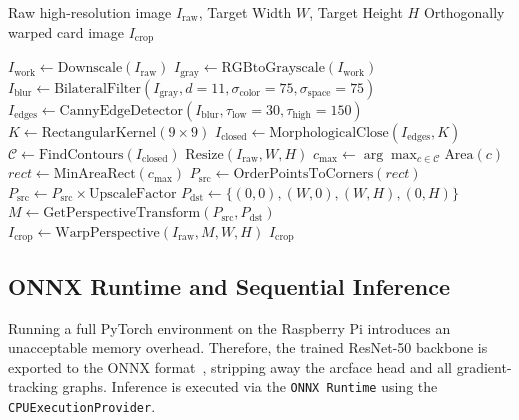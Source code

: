\begin{algorithm}[htbp]
    \caption{Card Localization and Homography Extraction}
    \label{alg:crop_card}
    \begin{algorithmic}[1]
    \Require Raw high-resolution image $I_{\text{raw}}$, Target Width $W$, Target Height $H$
    \Ensure Orthogonally warped card image $I_{\text{crop}}$

    \State $I_{\text{work}} \gets \text{Downscale}(I_{\text{raw}})$ 
    \State $I_{\text{gray}} \gets \text{RGBtoGrayscale}(I_{\text{work}})$
    \State $I_{\text{blur}} \gets \text{BilateralFilter}(I_{\text{gray}}, d=11, \sigma_{\text{color}}=75, \sigma_{\text{space}}=75)$
    \State $I_{\text{edges}} \gets \text{CannyEdgeDetector}(I_{\text{blur}}, \tau_{\text{low}}=30, \tau_{\text{high}}=150)$
    \State $K \gets \text{RectangularKernel}(9 \times 9)$
    \State $I_{\text{closed}} \gets \text{MorphologicalClose}(I_{\text{edges}}, K)$ 
    \State $\mathcal{C} \gets \text{FindContours}(I_{\text{closed}})$
        \State \Return $\text{Resize}(I_{\text{raw}}, W, H)$ 
    \EndIf
    \State $c_{\text{max}} \gets \arg\max_{c \in \mathcal{C}} \text{Area}(c)$
    \State $rect \gets \text{MinAreaRect}(c_{\text{max}})$ 
    \State $P_{\text{src}} \gets \text{OrderPointsToCorners}(rect)$ 
    \State $P_{\text{src}} \gets P_{\text{src}} \times \text{UpscaleFactor}$ 
    \State $P_{\text{dst}} \gets \{(0,0), (W,0), (W,H), (0,H)\}$
    \State $M \gets \text{GetPerspectiveTransform}(P_{\text{src}}, P_{\text{dst}})$
    \State $I_{\text{crop}} \gets \text{WarpPerspective}(I_{\text{raw}}, M, W, H)$
    \State \Return $I_{\text{crop}}$
    \end{algorithmic}
\end{algorithm}

\subsection{\acs{ONNX} Runtime and Sequential Inference}
Running a full PyTorch environment on the Raspberry Pi introduces an unacceptable memory overhead. Therefore, the trained \ac{ResNet}-50 backbone is exported to the \acf{ONNX} format~\cite{onnxruntime}, stripping away the \ac{arcface} head and all gradient-tracking graphs. Inference is executed via the \texttt{ONNX Runtime} using the \texttt{CPUExecutionProvider}.

